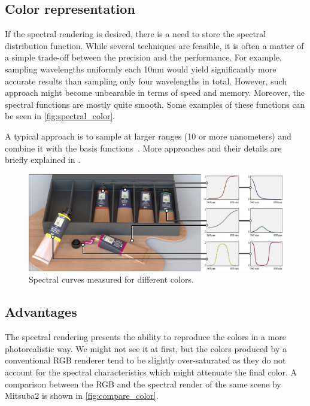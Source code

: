 \subsection{Color representation}

If the spectral rendering is desired, there is a need to store the spectral distribution function. While several techniques are feasible, it is often a matter of a simple trade-off between the precision and the performance. For example, sampling wavelengths uniformly each 10nm would yield significantly more accurate results than sampling only four wavelengths in total. However, such approach might become unbearable in terms of speed and memory. Moreover, the spectral functions are mostly quite smooth. Some examples of these functions can be seen in \autoref{fig:spectral_color}.

A typical approach is to sample at larger ranges (10 or more nanometers) and combine it with the basis functions~\cite{peercy1993linear}. More approaches and their details are briefly explained in \citet{wilkie2002tone}.

\begin{figure}[httpb]
	\centering
	\includegraphics[width=.9\linewidth]{img/spectral_color.jpg}
	\caption{Spectral curves measured for different colors\cite{jakob2019low}.}
	\label{fig:spectral_color}
\end{figure}

\subsection{Advantages}

The spectral rendering presents the ability to reproduce the colors in a more photorealistic way. We might not see it at first, but the colors produced by a conventional RGB renderer tend to be slightly over-saturated as they do not account for the spectral characteristics which might attenuate the final color. A comparison between the RGB and the spectral render of the same scene by Mitsuba2 is shown in \autoref{fig:compare_color}.

